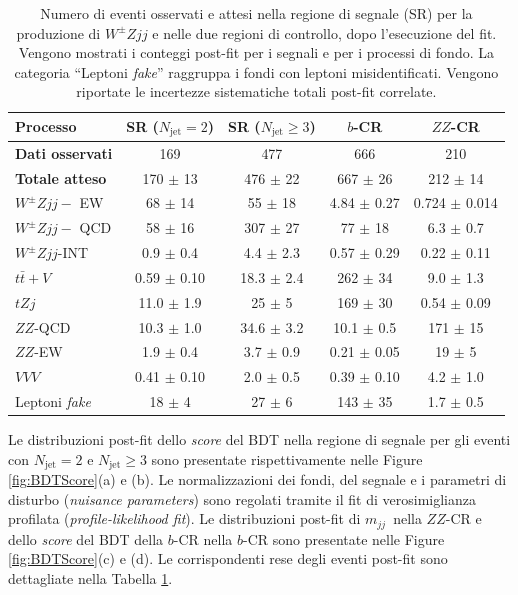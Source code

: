 \documentclass[11pt]{article}
\newcommand{\wzjjew}{$W^\pm Z jj-$ EW}
\newcommand{\wzjjqcd}{$W^\pm Z jj-$ QCD}
\newcommand{\wzjj}{$W^\pm Z jj$}
\newcommand{\mjj}{\ensuremath{m_{jj}}}
\begin{document}
\begin{table}[htbp] 
\centering
\renewcommand{\arraystretch}{1.4}
\begin{tabular}{l c c c c}
\hline
\textbf{Processo} & \textbf{SR ($N_{\text{jet}} = 2$)} & \textbf{SR ($N_{\text{jet}} \ge 3$)} & \textbf{$b$-CR} & \textbf{$ZZ$-CR} \\
\hline
\hline
\textbf{Dati osservati} & 169 & 477 & 666 & 210 \\
\textbf{Totale atteso} & 170 $\pm$ 13 & 476 $\pm$ 22 & 667 $\pm$ 26 & 212 $\pm$ 14 \\
\hline
\wzjjew & 68 $\pm$ 14 & 55 $\pm$ 18 & 4.84 $\pm$ 0.27 & 0.724 $\pm$ 0.014 \\
\wzjjqcd & 58 $\pm$ 16 & 307 $\pm$ 27 & 77 $\pm$ 18 & 6.3 $\pm$ 0.7 \\
\wzjj-INT & 0.9 $\pm$ 0.4 & 4.4 $\pm$ 2.3 & 0.57 $\pm$ 0.29 & 0.22 $\pm$ 0.11 \\
$t\bar{t}+V$ & 0.59 $\pm$ 0.10 & 18.3 $\pm$ 2.4 & 262 $\pm$ 34 & 9.0 $\pm$ 1.3 \\
$tZj$ & 11.0 $\pm$ 1.9 & 25 $\pm$ 5 & 169 $\pm$ 30 & 0.54 $\pm$ 0.09 \\
$ZZ$-QCD & 10.3 $\pm$ 1.0 & 34.6 $\pm$ 3.2 & 10.1 $\pm$ 0.5 & 171 $\pm$ 15 \\
$ZZ$-EW & 1.9 $\pm$ 0.4 & 3.7 $\pm$ 0.9 & 0.21 $\pm$ 0.05 & 19 $\pm$ 5 \\
$VVV$ & 0.41 $\pm$ 0.10 & 2.0 $\pm$ 0.5 & 0.39 $\pm$ 0.10 & 4.2 $\pm$ 1.0 \\
Leptoni \textit{fake} & 18 $\pm$ 4 & 27 $\pm$ 6 & 143 $\pm$ 35 & 1.7 $\pm$ 0.5 \\
\hline
\end{tabular}
\caption{Numero di eventi osservati e attesi nella regione di segnale (SR) per la produzione di $W^\pm Zjj$ e nelle due regioni di controllo, dopo l'esecuzione del fit. Vengono mostrati i conteggi post-fit per i segnali e per i processi di fondo. La categoria ``Leptoni \textit{fake}'' raggruppa i fondi con leptoni misidentificati. Vengono riportate le incertezze sistematiche totali post-fit correlate.}
\label{tab:VBSyield_postfit}
\end{table}

Le distribuzioni post-fit dello \textit{score} del BDT nella regione di segnale per gli eventi con $N_{\text{jet}} = 2$ e $N_{\text{jet}} \ge 3$ sono presentate rispettivamente nelle Figure \ref{fig:BDTScore}(a) e (b). Le normalizzazioni dei fondi, del segnale e i parametri di disturbo (\textit{nuisance parameters}) sono regolati tramite il fit di verosimiglianza profilata (\textit{profile-likelihood fit}). Le distribuzioni post-fit di \mjj\ nella $ZZ$-CR e dello \textit{score} del BDT della $b$-CR nella $b$-CR sono presentate nelle Figure \ref{fig:BDTScore}(c) e (d). Le corrispondenti rese degli eventi post-fit sono dettagliate nella Tabella \ref{tab:VBSyield_postfit}. 
\end{document}
